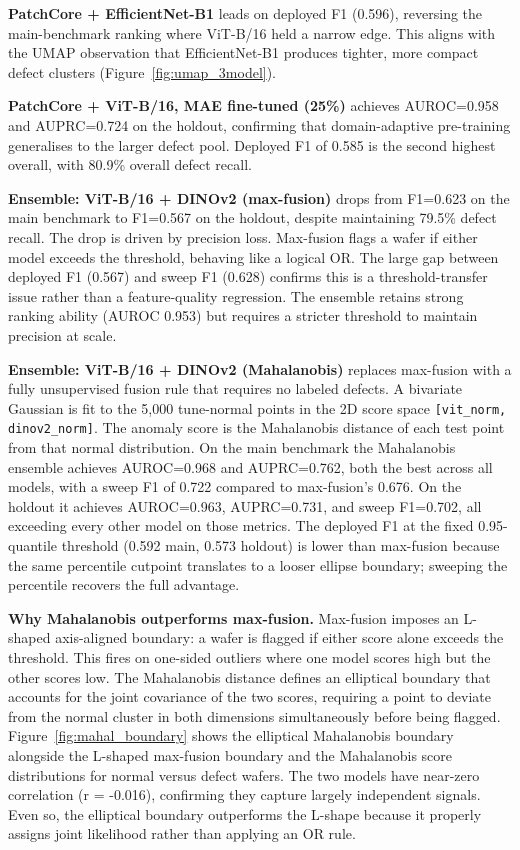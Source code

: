 \documentclass[11pt]{article}
\begin{document}
\textbf{PatchCore + EfficientNet-B1} leads on deployed F1 (0.596), reversing the main-benchmark ranking
where ViT-B/16 held a narrow edge. This aligns with the UMAP observation that EfficientNet-B1 produces
tighter, more compact defect clusters (Figure~\ref{fig:umap_3model}).

\textbf{PatchCore + ViT-B/16, MAE fine-tuned (25\%)} achieves AUROC=0.958 and AUPRC=0.724
on the holdout, confirming that domain-adaptive pre-training generalises to the larger defect pool.
Deployed F1 of 0.585 is the second highest overall, with 80.9\% overall defect recall.

\textbf{Ensemble: ViT-B/16 + DINOv2 (max-fusion)} drops from F1=0.623 on the main benchmark to F1=0.567
on the holdout, despite maintaining 79.5\% defect recall. The drop is driven by precision loss.
Max-fusion flags a wafer if either model exceeds the threshold, behaving like a logical OR. The large gap between deployed F1 (0.567) and sweep F1 (0.628) confirms
this is a threshold-transfer issue rather than a feature-quality regression. The ensemble retains strong ranking ability (AUROC 0.953) but requires a stricter threshold to maintain precision at scale.

\textbf{Ensemble: ViT-B/16 + DINOv2 (Mahalanobis)} replaces max-fusion with a fully unsupervised fusion rule that requires no labeled defects. A bivariate Gaussian is fit to the 5{,}000 tune-normal points in the 2D score space \texttt{[vit\_norm, dinov2\_norm]}. The anomaly score is the Mahalanobis distance of each test point from that normal distribution. On the main benchmark the Mahalanobis ensemble achieves AUROC=0.968 and AUPRC=0.762, both the best across all models, with a sweep F1 of 0.722 compared to max-fusion's 0.676. On the holdout it achieves AUROC=0.963, AUPRC=0.731, and sweep F1=0.702, all exceeding every other model on those metrics. The deployed F1 at the fixed 0.95-quantile threshold (0.592 main, 0.573 holdout) is lower than max-fusion because the same percentile cutpoint translates to a looser ellipse boundary; sweeping the percentile recovers the full advantage.

\textbf{Why Mahalanobis outperforms max-fusion.} Max-fusion imposes an L-shaped axis-aligned boundary: a wafer is flagged if either score alone exceeds the threshold. This fires on one-sided outliers where one model scores high but the other scores low. The Mahalanobis distance defines an elliptical boundary that accounts for the joint covariance of the two scores, requiring a point to deviate from the normal cluster in both dimensions simultaneously before being flagged. Figure~\ref{fig:mahal_boundary} shows the elliptical Mahalanobis boundary alongside the L-shaped max-fusion boundary and the Mahalanobis score distributions for normal versus defect wafers. The two models have near-zero correlation (r = -0.016), confirming they capture largely independent signals. Even so, the elliptical boundary outperforms the L-shape because it properly assigns joint likelihood rather than applying an OR rule.
\end{document}
